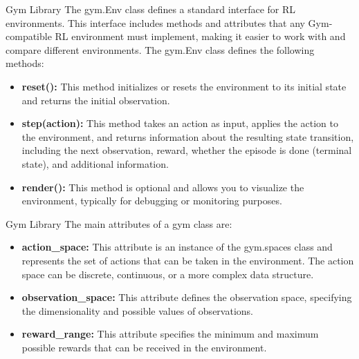 \begin{frame}
    \begin{content}{Gym Library}
        The gym.Env class defines a standard interface for RL environments. This interface includes methods and attributes that any Gym-compatible RL environment must implement, making it easier to work with and compare different environments. The gym.Env class defines the following methods:
        \begin{itemize}
            \item \textbf{reset():} This method initializes or resets the environment to its initial state and returns the initial observation.
            \item \textbf{step(action):} This method takes an action as input, applies the action to the environment, and returns information about the resulting state transition, including the next observation, reward, whether the episode is done (terminal state), and additional information.
            \item \textbf{render():} This method is optional and allows you to visualize the environment, typically for debugging or monitoring purposes.
        \end{itemize}
    \end{content}
\end{frame}
\begin{frame}
    \begin{content}{Gym Library}
        The main attributes of a gym class are:
        \begin{itemize}
            \item \textbf{action\_space:} This attribute is an instance of the gym.spaces class and represents the set of actions that can be taken in the environment. The action space can be discrete, continuous, or a more complex data structure.
            \item \textbf{observation\_space:} This attribute defines the observation space, specifying the dimensionality and possible values of observations.
            \item \textbf{reward\_range:} This attribute specifies the minimum and maximum possible rewards that can be received in the environment.
        \end{itemize}
    \end{content}
\end{frame}